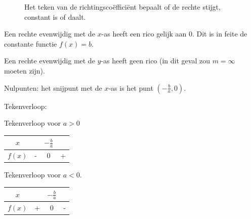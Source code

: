 \begin{figure}[h]
	\centering
	\begin{subfigure}{0.3\textwidth}
	
	\caption{}
	\label{fig:rico_pos}	
	\end{subfigure}
	\begin{subfigure}{0.3\textwidth}
	
	\caption{}
	\label{fig:rico_nul}	
	\end{subfigure}
	\begin{subfigure}{0.3\textwidth}
	
	\caption{}
	\label{fig:rico_neg}	
\end{subfigure}
\caption{Het teken van de richtingscoëfficiënt bepaalt of de rechte stijgt, constant is of daalt.}
\label{fig:rico}

\end{figure}
  



Een rechte evenwijdig met de $x$-as heeft een rico gelijk
aan 0. Dit is in feite de constante functie $f(x)=b$.

Een rechte evenwijdig met de $y$-as heeft geen rico (in
dit geval zou $m=\infty$ moeten zijn). 

Nulpunten: het snijpunt met de $x$-as is het
punt $(-\frac{b}{a},0)$.

%

Tekenverloop: 
\begin{tabel}{Tekenverloop voor $a>0$}
	\centering\begin{tabular}{c||c|c|c}
		$x$ &  & $-\frac{b}{a}$ & \\
		\hline 
		$f(x)$ & - & 0 & +\\
	\end{tabular}
\end{tabel}

\begin{tabel}{Tekenverloop voor $a<0$.}
	\centering\begin{tabular}{c||c|c|c}
		$x$ &  & $-\frac{b}{a}$ & \\
		\hline 
		$f(x)$ & + & 0 & -\\
	\end{tabular}
	\label{tab:eerst_akl0}
\end{tabel}

